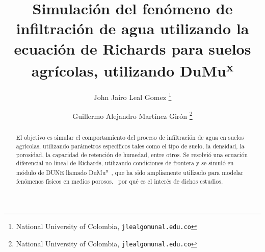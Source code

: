 \documentclass[
	a4paper,
	abstract=true
]
{scrartcl}
\date{}
\title{Simulación del fenómeno de infiltración de agua utilizando la ecuación de Richards para suelos agrícolas, utilizando DuMu\textsuperscript{x}} %
\author{John Jairo Leal Gomez
	\thanks{
		National University of Colombia,
		\texttt{jlealgom\MVAt unal.edu.co}}
    \and Guillermo Alejandro Martínez Girón
    \thanks{
		National University of Colombia,
		\texttt{jlealgom\MVAt unal.edu.co}}
}
\begin{document}
\maketitle

\begin{abstract}
	El objetivo es simular el comportamiento del proceso de infiltración de agua en suelos agrícolas,
	utilizando parámetros específicos tales como el tipo de suelo, la densidad, la porosidad,
	la capacidad de retención de humedad, entre otros.
	Se resolvió una ecuación diferencial no lineal de Richards, utilizando condiciones de frontera y
	se simuló en módulo de DUNE llamado DuMu\textsuperscript{x}~\cite{Kochetal2020Dumux}, que ha sido
	ampliamente utilizado para modelar fenómenos físicos en medios porosos.~\cite{CHAVEZNEGRETE2018168}
	por qué es el interés de dichos estudios.

\end{abstract}

\nocite{*}

\end{document}
